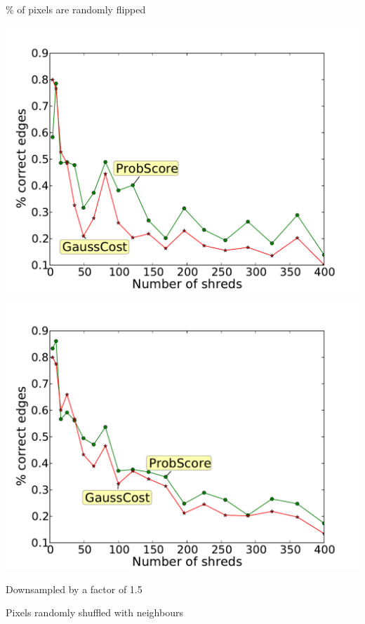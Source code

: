 \documentclass[portrait,final,a0paper,fontscale=0.277]{baposter}
\begin{document}
\begin{poster}
{\begin{minipage}[t]{0.98\linewidth}
        \begin{minipage}[t]{0.48\linewidth}
                \centering
                \% of pixels are randomly flipped
        \end{minipage}
        \begin{minipage}[t]{0.48\linewidth}
                \centering
                \includegraphics[width=\textwidth]{downsample}
        \end{minipage}
        \begin{minipage}[t]{0.48\linewidth}
                \centering
                \includegraphics[width=\textwidth]{shuffle}
        \end{minipage}
        \begin{minipage}[t]{0.48\linewidth}
                \centering
                \smaller Downsampled by a factor of 1.5
        \end{minipage}
        \begin{minipage}[t]{0.48\linewidth}
                \centering
                \smaller Pixels randomly shuffled with neighbours
        \end{minipage}
    \end{minipage}
}


\end{poster}
\end{document}
